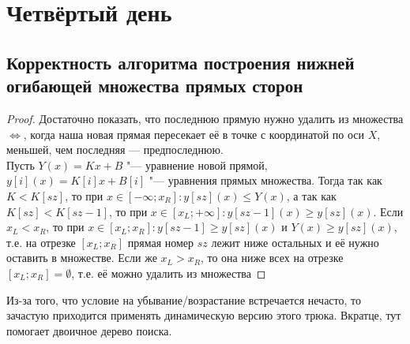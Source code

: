 \documentclass[a4paper, 12pt]{article}
\theoremstyle{plain}
\theoremstyle{definition}
\theoremstyle{remark}
\begin{document}
\section{Четвёртый день}
\subsection{Корректность алгоритма построения нижней огибающей множества прямых сторон}
\begin{proof}
	Достаточно показать, что последнюю прямую нужно удалить из множества $\Leftrightarrow$, когда наша новая прямая пересекает её в точке с координатой по оси $X$, меньшей, чем последняя --- предпоследнюю.\\
	Пусть $Y(x)=Kx+B$ "--- уравнение новой прямой, $y[i](x)=K[i]x+B[i]$ "--- уравнения прямых множества. Тогда так как $K<K[sz]$, то при $x\in[-\infty;x_R]:y[sz](x)\leq Y(x)$, а так как $K[sz]<K[sz-1]$, то при $x\in[x_L;+\infty]:y[sz-1](x)\geq y[sz](x)$. Если $x_L<x_R$, то при $x\in[x_L;x_R]:y[sz-1]\geq y[sz](x)$ и $Y(x)\geq y[sz](x)$, т.е. на отрезке $[x_L;x_R]$ прямая номер $sz$ лежит ниже остальных и её нужно оставить в множестве. Если же $x_L > x_R$, то она ниже всех на отрезке $[x_L;x_R]=\emptyset$, т.е. её можно удалить из множества
\end{proof}
Из-за того, что условие на убывание/возрастание встречается нечасто, то зачастую приходится применять динамическую версию этого трюка. Вкратце, тут помогает двоичное дерево поиска.
\end{document}
